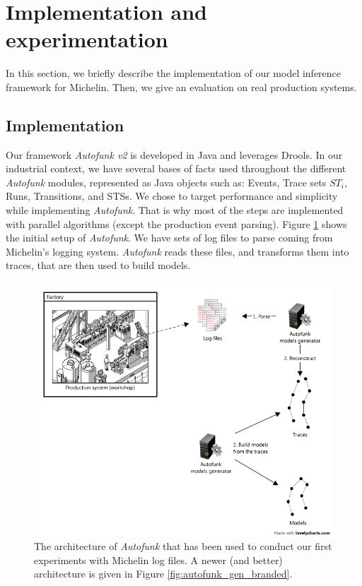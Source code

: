 
\section{Implementation and experimentation}
\label{sec:modelinf:prodsystems:results}

In this section, we briefly describe the implementation of our
model inference framework for Michelin. Then, we give an
evaluation on real production systems.

\subsection{Implementation}
\label{sec:prodsystems:impl-exp-collect}

Our framework \textit{Autofunk v2} is developed in Java and
leverages Drools.  In our industrial context, we have several
bases of facts used throughout the different \textit{Autofunk}
modules, represented as Java objects such as: Events, Trace sets
$ST_i$, Runs, Transitions, and STSs. We chose to target
performance and simplicity while implementing \textit{Autofunk}.
That is why most of the steps are implemented with parallel
algorithms (except the production event parsing). Figure
\ref{fig:autofunk_initial_setup} shows the initial setup of
\textit{Autofunk}. We have sets of log files to parse coming from
Michelin's logging system. \textit{Autofunk} reads these files,
and transforms them into traces, that are then used to build
models.

\begin{figure}[ht]
    \includegraphics[width=1.0\linewidth]{figures/autofunk_initial_setup.png}

    \caption{The architecture of \textit{Autofunk} that has been
        used to conduct our first experiments with Michelin log
        files. A newer (and better) architecture is given in
        Figure \ref{fig:autofunk_gen_branded}.}
    \label{fig:autofunk_initial_setup}
\end{figure}

